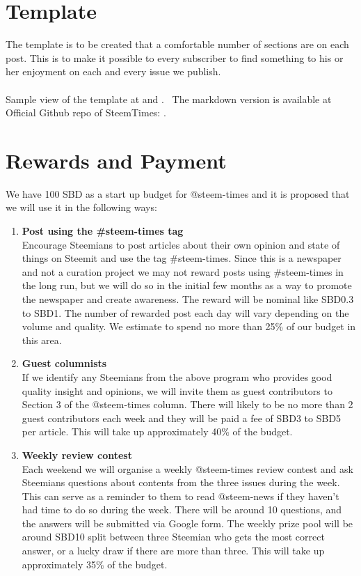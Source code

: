 \documentclass[a4paper,12pt]{article}
\newcommand{\lnk}[3][blue]{\href{#2}{\color{#1}{#3}}}%
\newcommand{\sectionbreak}{\clearpage}
\begin{document}
\section {Template}

The template is to be created that a comfortable number of sections are on each post. This is to make it possible to every subscriber to find something to his or her enjoyment on each and every issue we publish. 
\\\\
Sample view of the template at \lnk{https://steemit.com/esteem/@johnsonlai/say-no-more-to-microsoft-word-fe73aa1ca8232}{steemit} and \lnk{https://busy.org/esteem/@johnsonlai/say-no-more-to-microsoft-word-fe73aa1ca8232}{busy.org}. \
The markdown version is available at Official Github repo of SteemTimes: \lnk{https://github.com/superoo7/SteemTimes/blame/master/format.md}{format.md}.

\sectionbreak
\section {Rewards and Payment}


We have 100 SBD as a start up budget for @steem-times and it is proposed that we will use it in the following ways:

\begin{enumerate}
    \item \textbf{Post using the \#steem-times tag}\\Encourage Steemians to post articles about their own opinion and state of things on Steemit and use the tag  \#steem-times.  Since this is a newspaper and not a curation project we may not reward posts using \#steem-times in the long run, but we will do so in the initial few months as a way to promote the newspaper and create awareness.  The reward will be nominal like SBD0.3 to SBD1.  The number of rewarded post each day will vary depending on the volume and quality.  We estimate to spend no more than 25\%  of our budget in this area.
    \item \textbf{Guest columnists}\\If we identify any Steemians from the above program who provides good quality insight and opinions, we will invite them as guest contributors to Section 3 of the @steem-times column.  There will likely to be no more than 2 guest contributors each week and they will be paid a fee of SBD3 to SBD5 per article.  This will take up approximately 40\% of the budget.
    \item \textbf{Weekly review contest}\\Each weekend we will organise a weekly @steem-times review contest and ask Steemians questions about contents from the three issues during the week.  This can serve as a reminder to them to read @steem-news if they haven't had time to do so during the week.  There will be around 10 questions, and the answers will be submitted via Google form.  The weekly prize pool will be around  SBD10 split between three Steemian who gets the most correct answer, or a lucky draw if there are more than three.  This will take up approximately 35\% of the budget.
\end{enumerate}
\end{document}
